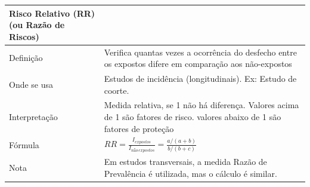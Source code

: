 \documentclass[
]{book}
\begin{document}
\begin{longtable}[]{@{}ll@{}}
\toprule
\begin{minipage}[b]{0.22\columnwidth}\raggedright
Risco Relativo (RR) (ou Razão de Riscos)\strut
\end{minipage} & \begin{minipage}[b]{0.72\columnwidth}\raggedright
\strut
\end{minipage}\tabularnewline
\midrule
\endhead
\begin{minipage}[t]{0.22\columnwidth}\raggedright
Definição\strut
\end{minipage} & \begin{minipage}[t]{0.72\columnwidth}\raggedright
Verifica quantas vezes a ocorrência do desfecho entre os expostos difere em comparação aos não-expostos\strut
\end{minipage}\tabularnewline
\begin{minipage}[t]{0.22\columnwidth}\raggedright
Onde se usa\strut
\end{minipage} & \begin{minipage}[t]{0.72\columnwidth}\raggedright
Estudos de incidência (longitudinais). Ex: Estudo de coorte.\strut
\end{minipage}\tabularnewline
\begin{minipage}[t]{0.22\columnwidth}\raggedright
Interpretação\strut
\end{minipage} & \begin{minipage}[t]{0.72\columnwidth}\raggedright
Medida relativa, se 1 não há diferença. Valores acima de 1 são fatores de risco. valores abaixo de 1 são fatores de proteção\strut
\end{minipage}\tabularnewline
\begin{minipage}[t]{0.22\columnwidth}\raggedright
Fórmula\strut
\end{minipage} & \begin{minipage}[t]{0.72\columnwidth}\raggedright
\(RR = \frac{I_{expostos}}{I_{não \, expostos}} = \frac{a/(a+b)}{b/(b+c)}\)\strut
\end{minipage}\tabularnewline
\begin{minipage}[t]{0.22\columnwidth}\raggedright
Nota\strut
\end{minipage} & \begin{minipage}[t]{0.72\columnwidth}\raggedright
Em estudos transversais, a medida Razão de Prevalência é utilizada, mas o cálculo é similar.\strut
\end{minipage}\tabularnewline
\bottomrule
\end{longtable}
\end{document}

